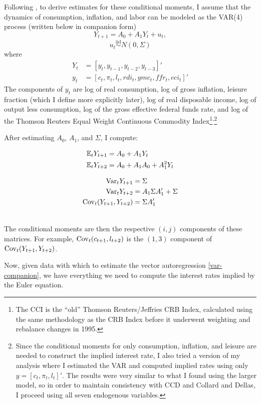 Following \cite{canzoneri07}, to derive estimates for these conditional moments, I assume that the dynamics of consumption, inflation, and labor can be modeled as the VAR(4) process (written below in companion form)
\begin{equation}
\label{var-companion}
Y_{t+1} = A_0 + A_1 Y_t + u_t,
\end{equation}
$$u_t \overset{\text{iid}}{\sim} N(0, \Sigma)$$
where
\begin{align*}
Y_t &= [y_t, y_{t-1}, y_{t-2}, y_{t-3}]' \\
y_t &= [c_t, \pi_t, l_t, rdi_t, ymc_t, ffr_t, cci_t]'
\end{align*}
The components of $y_t$ are log of real consumption, log of gross inflation, leisure fraction (which I define more explicitly later), log of real disposable income, log of output less consumption, log of the gross effective federal funds rate, and log of the Thomson Reuters Equal Weight Continuous Commodity Index\footnote{The CCI is the ``old'' Thomson Reuters/Jeffries CRB Index, calculated using the same methodology as the CRB Index before it underwent weighting and rebalance changes in 1995.}\textsuperscript{,}\footnote{Since the conditional moments for only consumption, inflation, and leisure are needed to construct the implied interest rate, I also tried a version of my analysis where I estimated the VAR and computed implied rates using only $y = [c_t, \pi_t, l_t]'$. The results were very similar to what I found using the larger model, so in order to maintain consistency with CCD and Collard and Dellas, I proceed using all seven endogenous variables.}

After estimating $A_0$, $A_1$, and $\Sigma$, I compute:

\begin{minipage}[c]{0.5\textwidth}
\begin{align*}
\mathbb{E}_t Y_{t+1} &= A_0 + A_1 Y_t \\
\mathbb{E}_t Y_{t+2} &= A_0 + A_1 A_0 + A_1^2 Y_t
\end{align*}
\end{minipage}
\begin{minipage}[c]{0.5\textwidth}
\begin{align*}
\mathrm{Var}_t Y_{t+1} &= \Sigma \\
\mathrm{Var}_t Y_{t+2} &= A_1 \Sigma A_1' + \Sigma \\
\mathrm{Cov}_t(Y_{t+1}, Y_{t+2}) &= \Sigma A_1'
\end{align*}
\end{minipage} \\

The conditional moments are then the respective $(i, j)$ components of these matrices. For example, $\mathrm{Cov}_t(c_{t+1}, l_{t+2})$ is the $(1, 3)$ component of $\mathrm{Cov}_t(Y_{t+1}, Y_{t+2})$.

Now, given data with which to estimate the vector autoregression \eqref{var-companion}, we have everything we need to compute the interest rates implied by the Euler equation.